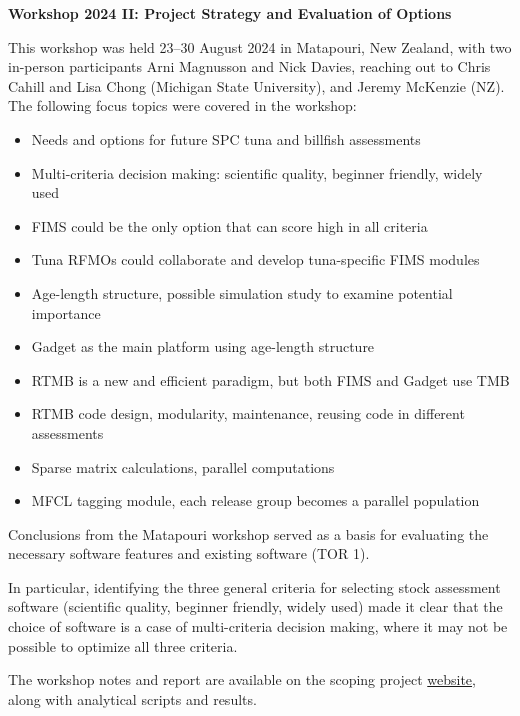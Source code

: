 \documentclass{SCreport}
\newcommand\tree
{https://github.com/PacificCommunity/ofp-sam-transition-plan/tree/main}
\begin{document}
\newpage

\textbf{Workshop 2024 II: Project Strategy and Evaluation of Options}

\vspace{1ex}

This workshop was held 23--30 August 2024 in Matapouri, New Zealand, with two
in-person participants Arni Magnusson and Nick Davies, reaching out to Chris
Cahill and Lisa Chong (Michigan State University), and Jeremy McKenzie (NZ). The
following focus topics were covered in the workshop:

\begin{itemize}
  \item Needs and options for future SPC tuna and billfish assessments
  \item Multi-criteria decision making: scientific quality, beginner friendly,
  widely used
  \item FIMS could be the only option that can score high in all criteria
  \item Tuna RFMOs could collaborate and develop tuna-specific FIMS modules
  \item Age-length structure, possible simulation study to examine potential
  importance
  \item Gadget as the main platform using age-length structure
  \item RTMB is a new and efficient paradigm, but both FIMS and Gadget use TMB
  \item RTMB code design, modularity, maintenance, reusing code in different
  assessments
  \item Sparse matrix calculations, parallel computations
  \item MFCL tagging module, each release group becomes a parallel population
\end{itemize}

\vspace{1ex}

Conclusions from the Matapouri workshop served as a basis for evaluating the
necessary software features and existing software (TOR 1).

In particular, identifying the three general criteria for selecting stock
assessment software (scientific quality, beginner friendly, widely used) made it
clear that the choice of software is a case of multi-criteria decision making,
where it may not be possible to optimize all three criteria.

The workshop notes and report are available on the scoping project
\href{\tree/workshops/2024-08-matapouri}{website}, along with analytical scripts
and results.
\end{document}
